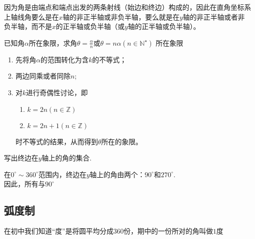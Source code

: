 \vspace{0.4cm}
\begin{remark}
因为角是由端点和端点出发的两条射线（始边和终边）构成的，因此在直角坐标系上轴线角要么是在$x$轴的非正半轴或非负半轴，要么就是在$y$轴的非正半轴或者非负半轴，而不是$x$的正半轴或负半轴（或$y$轴的正半轴或负半轴）。
\end{remark}

\vspace{0.4cm}

\begin{note}{已知角$\alpha$所在象限，求角$\displaystyle \theta = \frac{\alpha}{n} \mbox{或} \theta = n \alpha \left(n \in {\mathbb{N}}^\star \right) $ 所在象限}
\begin{enumerate}
\item 先将角$\alpha$的范围转化为含$k$的不等式；
\item 两边同乘或者同除$n$;
\item 对$k$进行奇偶性讨论，即
\begin{enumerate}
\item $k = 2n \left( n \in \mathbb{Z} \right)$
\item $k = 2n + 1 \left( n \in \mathbb{Z} \right)$
\end{enumerate} 
时不等式的结果，从而得到$\theta$所在的象限。
\end{enumerate}
\end{note}

\begin{exercise}
写出终边在$y$轴上的角的集合.
\end{exercise}

\begin{solution}
在$0^{\circ} \sim 360^{\circ}$范围内，终边在$y$轴上的角由两个：$90^{\circ} \mbox{和} 270^{\circ}$.\\
因此，所有与$90^{\circ}$
\end{solution}

\subsection{弧度制}

在初中我们知道“度”是将圆平均分成360份，期中的一份所对的角叫做$1$度

\begin{figure}
	\begin{center}
	\end{center}
\end{figure}

